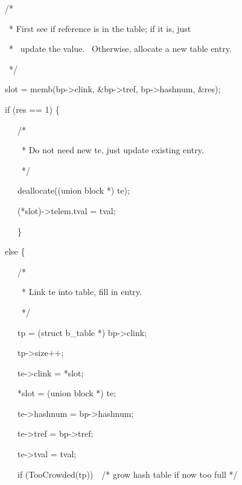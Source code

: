 {\ttfamily\mdseries
\ \ \ /*}

{\ttfamily\mdseries
\ \ \ \ * First see if reference is in the table; if it is, just }

{\ttfamily\mdseries
\ \ \ \ * \ update the value. \ Otherwise, allocate a new table entry.}

{\ttfamily\mdseries
\ \ \ \ */}

{\ttfamily\mdseries
\ \ \ slot = memb(bp-{\textgreater}clink, \&bp-{\textgreater}tref, bp-{\textgreater}hashnum, \&res);}


\bigskip

{\ttfamily\mdseries
\ \ \ if (res == 1) \{}

{\ttfamily\mdseries
\ \ \ \ \ \ /*}

{\ttfamily\mdseries
\ \ \ \ \ \ \ * Do not need new te, just update existing entry.}

{\ttfamily\mdseries
\ \ \ \ \ \ \ */}

{\ttfamily\mdseries
\ \ \ \ \ \ deallocate((union block *) te);}

{\ttfamily\mdseries
\ \ \ \ \ \ (*slot)-{\textgreater}telem.tval = tval;}

{\ttfamily\mdseries
\ \ \ \ \ \ \}}

{\ttfamily\mdseries
\ \ \ else \{}

{\ttfamily\mdseries
\ \ \ \ \ \ /*}

{\ttfamily\mdseries
\ \ \ \ \ \ \ * Link te into table, fill in entry.}

{\ttfamily\mdseries
\ \ \ \ \ \ \ */}

{\ttfamily\mdseries
\ \ \ \ \ \ tp = (struct b\_table *) bp-{\textgreater}clink;}

{\ttfamily\mdseries
\ \ \ \ \ \ tp-{\textgreater}size++;}


\bigskip

{\ttfamily\mdseries
\ \ \ \ \ \ te-{\textgreater}clink = *slot;}

{\ttfamily\mdseries
\ \ \ \ \ \ *slot = (union block *) te;}


\bigskip

{\ttfamily\mdseries
\ \ \ \ \ \ te-{\textgreater}hashnum = bp-{\textgreater}hashnum;}

{\ttfamily\mdseries
\ \ \ \ \ \ te-{\textgreater}tref = bp-{\textgreater}tref;}

{\ttfamily\mdseries
\ \ \ \ \ \ te-{\textgreater}tval = tval;}


\bigskip

{\ttfamily\mdseries
\ \ \ \ \ \ if (TooCrowded(tp))\ \ /* grow hash table if now too full */}

